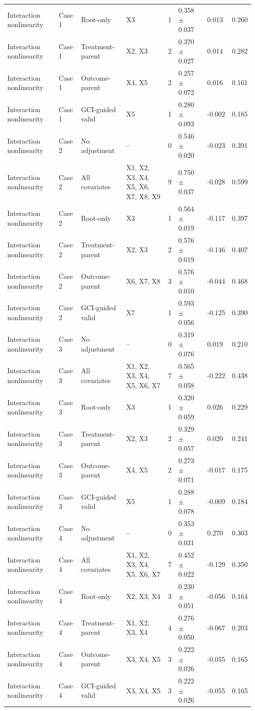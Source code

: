 \begin{tabular}{llllrlll}
Interaction nonlinearity & Case 1 & Root-only & X3 & 1 & 0.358 $\pm$ 0.037 & 0.013 & 0.260 \\
Interaction nonlinearity & Case 1 & Treatment-parent & X2, X3 & 2 & 0.370 $\pm$ 0.027 & 0.014 & 0.282 \\
Interaction nonlinearity & Case 1 & Outcome-parent & X4, X5 & 2 & 0.257 $\pm$ 0.072 & 0.016 & 0.161 \\
Interaction nonlinearity & Case 1 & GCI-guided valid & X5 & 1 & 0.280 $\pm$ 0.093 & -0.002 & 0.185 \\
Interaction nonlinearity & Case 2 & No adjustment & -- & 0 & 0.546 $\pm$ 0.020 & -0.023 & 0.391 \\
Interaction nonlinearity & Case 2 & All covariates & X1, X2, X3, X4, X5, X6, X7, X8, X9 & 9 & 0.750 $\pm$ 0.037 & -0.028 & 0.599 \\
Interaction nonlinearity & Case 2 & Root-only & X3 & 1 & 0.564 $\pm$ 0.019 & -0.117 & 0.397 \\
Interaction nonlinearity & Case 2 & Treatment-parent & X2, X3 & 2 & 0.576 $\pm$ 0.019 & -0.146 & 0.407 \\
Interaction nonlinearity & Case 2 & Outcome-parent & X6, X7, X8 & 3 & 0.576 $\pm$ 0.010 & -0.044 & 0.468 \\
Interaction nonlinearity & Case 2 & GCI-guided valid & X7 & 1 & 0.593 $\pm$ 0.056 & -0.125 & 0.390 \\
Interaction nonlinearity & Case 3 & No adjustment & -- & 0 & 0.319 $\pm$ 0.076 & 0.019 & 0.210 \\
Interaction nonlinearity & Case 3 & All covariates & X1, X2, X3, X4, X5, X6, X7 & 7 & 0.565 $\pm$ 0.058 & -0.222 & 0.438 \\
Interaction nonlinearity & Case 3 & Root-only & X3 & 1 & 0.320 $\pm$ 0.059 & 0.026 & 0.229 \\
Interaction nonlinearity & Case 3 & Treatment-parent & X2, X3 & 2 & 0.329 $\pm$ 0.057 & 0.020 & 0.241 \\
Interaction nonlinearity & Case 3 & Outcome-parent & X4, X5 & 2 & 0.273 $\pm$ 0.071 & -0.017 & 0.175 \\
Interaction nonlinearity & Case 3 & GCI-guided valid & X5 & 1 & 0.288 $\pm$ 0.078 & -0.009 & 0.184 \\
Interaction nonlinearity & Case 4 & No adjustment & -- & 0 & 0.353 $\pm$ 0.031 & 0.270 & 0.303 \\
Interaction nonlinearity & Case 4 & All covariates & X1, X2, X3, X4, X5, X6, X7 & 7 & 0.452 $\pm$ 0.022 & -0.129 & 0.350 \\
Interaction nonlinearity & Case 4 & Root-only & X2, X3, X4 & 3 & 0.230 $\pm$ 0.051 & -0.056 & 0.164 \\
Interaction nonlinearity & Case 4 & Treatment-parent & X1, X2, X3, X4 & 4 & 0.276 $\pm$ 0.050 & -0.067 & 0.203 \\
Interaction nonlinearity & Case 4 & Outcome-parent & X3, X4, X5 & 3 & 0.222 $\pm$ 0.026 & -0.055 & 0.165 \\
Interaction nonlinearity & Case 4 & GCI-guided valid & X3, X4, X5 & 3 & 0.222 $\pm$ 0.026 & -0.055 & 0.165 \\
\bottomrule
\end{tabular}
